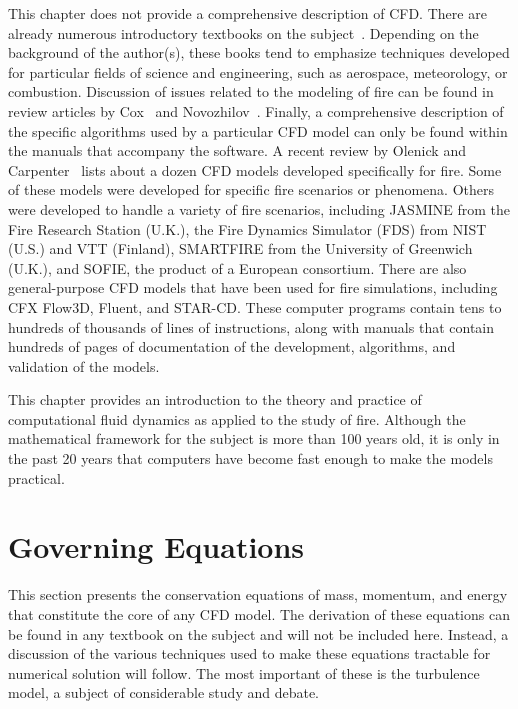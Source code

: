 \documentclass[graybox]{svmult}
\begin{document}
This chapter does not provide a comprehensive description of CFD. There are already numerous introductory textbooks on the subject~\cite{Anderson, Ferziger, Patankar, Peyret, Versteeg}. Depending on the background of the author(s), these books tend to emphasize techniques developed for particular fields of science and engineering, such as aerospace, meteorology, or combustion. Discussion of issues related to the modeling of fire can be found in review articles by Cox~\cite{Cox:1995,Cox:1998}  and Novozhilov~\cite{Novozhilov}. Finally, a comprehensive description of the specific algorithms used by a particular CFD model can only be found within the manuals that accompany the software. A recent review by Olenick and Carpenter~\cite{Olenick} lists about a dozen CFD models developed specifically for fire. Some of these models were developed for specific fire scenarios or phenomena. Others were developed to handle a variety of fire scenarios, including JASMINE from the Fire Research Station (U.K.), the Fire Dynamics Simulator (FDS) from NIST (U.S.) and VTT (Finland), SMARTFIRE from the University of Greenwich (U.K.), and SOFIE, the product of a European consortium. There are also general-purpose CFD models that have been used for fire simulations, including CFX Flow3D, Fluent, and STAR-CD. These computer programs contain tens to hundreds of thousands of lines of instructions, along with manuals that contain hundreds of pages of documentation of the development, algorithms, and validation of the models.

This chapter provides an introduction to the theory and practice of computational fluid dynamics as applied to the study of fire. Although the mathematical framework for the subject is more than 100 years old, it is only in the past 20 years that computers have become fast enough to make the models practical.


\section{Governing Equations}

This section presents the conservation equations of mass, momentum, and energy that constitute the core of any CFD model. The derivation of these equations can be found in any textbook on the subject and will not be included here. Instead, a discussion of the various techniques used to make these equations tractable for numerical solution will follow. The most important of these is the turbulence model, a subject of considerable study and debate.
\end{document}
